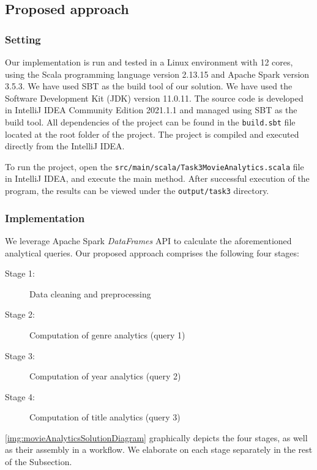\documentclass[acmlarge]{acmart}
\begin{document}
  \subsection{Proposed approach}
  \subsubsection{Setting}
  Our implementation is run and tested in a Linux environment with 12 cores, using the Scala programming language version 2.13.15 and Apache Spark version 3.5.3. We have used SBT as the build tool of our solution.
  We have used the Software Development Kit (JDK) version 11.0.11.
  The source code is developed in IntelliJ IDEA Community Edition 2021.1.1 and managed using SBT as the build tool. All dependencies of the project can be found in the \texttt{build.sbt} file located at the root folder of the project.
  The project is compiled and executed directly from the IntelliJ IDEA.

  To run the project, open the \texttt{src/main/scala/Task3MovieAnalytics.scala} file in IntelliJ IDEA, and execute the main method. After successful execution of the program, the results can be viewed under the \texttt{output/task3} directory.

  \subsubsection{Implementation} We leverage Apache Spark \emph{DataFrames} API to calculate the aforementioned analytical queries. Our proposed approach comprises the following four stages:
  \begin{description}
    \item[Stage 1:] Data cleaning and preprocessing
    \item[Stage 2:] Computation of genre analytics (query 1)
    \item[Stage 3:] Computation of year analytics (query 2)
    \item[Stage 4:] Computation of title analytics (query 3)
  \end{description}
  \autoref{img:movieAnalyticsSolutionDiagram} graphically depicts the four stages, as well as their assembly in a workflow. We elaborate on each stage separately in the rest of the Subsection.
\end{document}
